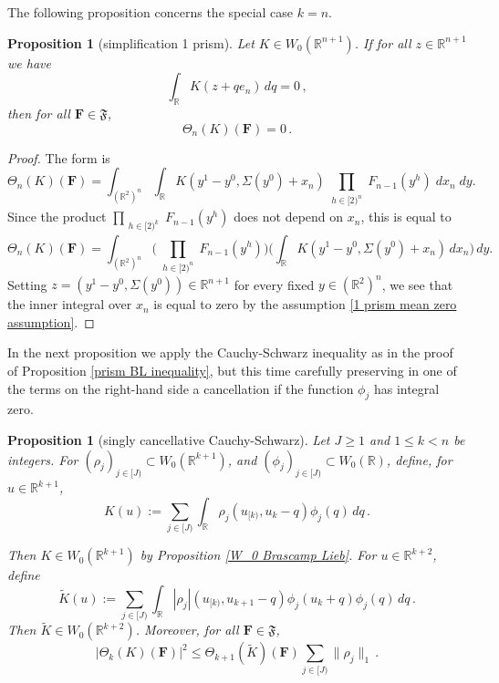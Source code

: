 \documentclass[12pt,reqno]{amsart}
\theoremstyle{plain}
\newtheorem{proposition}[theorem]{Proposition}
\numberwithin{equation}{section}
\theoremstyle{remark}
\newcommand{\uses}[1]{}
\newcommand{\usesdefs}[1]{}
\newcommand{\R}{{\mathbb R}}
\newcommand{\F}{\mathbf{F}}
\begin{document}
The following proposition concerns the special case $k=n$.
\begin{proposition}[simplification 1 prism]\label{simplification 1 prism}\uses{}\usesdefs{auto:Wiener-space-definition,normalized function tuples,prism Brascamp--Lieb}
    Let $K\in W_0(\R^{n+1})$. If for all $z\in \R^{n+1}$ we have
    \begin{equation}\label{1 prism mean zero assumption}
        \int_\R K(z+qe_n)\, dq=0\, ,
    \end{equation}
    then for all $\F\in \mathfrak{F}$,
    \begin{equation}\label{auto:terminal-K-form-zero}
         \Theta_n(K)(\F)= 0\, .
    \end{equation}
\end{proposition}
\begin{proof}
The form is
\[ \Theta_{n}(K)(\F) = \int_{(\R^{2})^n} \int_{\R} K(y^1-y^0, \Sigma(y^0) + x_n)
\prod_{\substack{h\in [2)^n}} F_{n-1}( y^h)\;dx_n\;dy. \]
Since the product $\prod_{\substack{h\in [2)^k}} F_{n-1}( y^h)$ does not depend on $x_n$, this is equal to
\[\Theta_n(K)(\F) = \int_{(\R^{2})^n} \Big( \prod_{\substack{h\in [2)^n}} F_{n-1}( y^h) \Big) \Big(\int_{\R} K(y^1-y^0, \Sigma(y^0) + x_n)\,dx_n\Big)\,dy. \]
Setting $z=(y^1-y^0, \Sigma(y^0))\in\R^{n+1}$ for every fixed $y\in (\R^2)^n$, we see that the inner integral over $x_n$ is equal to zero by the assumption \eqref{1 prism mean zero assumption}.
\end{proof}


In the next proposition we apply the Cauchy-Schwarz inequality as in the proof of Proposition \ref{prism BL inequality}, but this time carefully preserving in one of the terms on the right-hand side
a cancellation if the function $\phi_j$ has integral zero.


\begin{proposition}[singly cancellative Cauchy-Schwarz]\label{single cancellative Cauchy-Schwarz}\uses{cube BL inequality,W_0 Brascamp Lieb}\usesdefs{auto:Wiener-space-definition,normalized function tuples,cube Brascamp--Lieb,prism Brascamp--Lieb}
Let $J\ge 1$ and $1\le k<n$ be integers. For
$(\rho_j)_{j\in [J)}\subset W_0(\R^{k+1})$, and
$(\phi_j)_{j\in [J)}\subset W_0(\R)$, define, for $u\in \R^{k+1}$,
\begin{equation}\label{auto:Cauchy-Schwarz-kernel-K}
    K(u):=\sum_{j\in[J)}\int_\R \rho_j(u_{[k)},u_k-q)\phi_j(q)\,dq\,.
\end{equation}

Then $K\in W_0(\R^{k+1})$ by Proposition \ref{W_0 Brascamp Lieb}.
For $u\in \R^{k+2}$, define
\begin{equation}\label{auto:Cauchy-Schwarz-kernel-tilde-K}
    \tilde{K}(u):=\sum_{j\in[J)}\int_\R
    |\rho_j|(u_{[k)},u_{k+1}-q)\phi_j(u_k+q)\phi_j(q)\,dq\, .
\end{equation}
Then $\tilde{K}\in W_0(\R^{k+2})$.
Moreover, for all $\F\in\mathfrak{F}$,
\begin{equation}\label{auto:Cauchy-Schwarz-at-k-bound}
    |\Theta_k(K)(\F)|^2
    \le \Theta_{k+1}(\tilde{K})(\F)\sum_{j\in[J)}\|\rho_j\|_1\, .
\end{equation}
\end{proposition}
\end{document}
